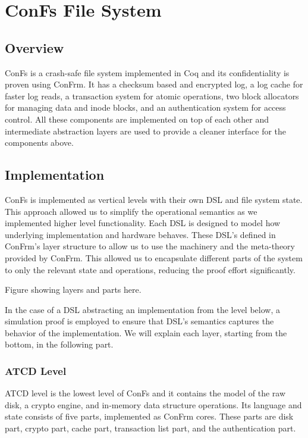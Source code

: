 \chapter{ConFs File System}

\section{Overview}
ConFs is a crash-safe file system implemented in Coq and its confidentiality is proven using ConFrm. It has a checksum based and encrypted log, a log cache for faster log reads, a transaction system for atomic operations, two block allocators for managing data and inode blocks, and an authentication system for access control. All these components are implemented on top of each other and intermediate abstraction layers are used to provide a cleaner interface for the components above.

\section{Implementation}
ConFs is implemented as vertical levels with their own DSL and file system state. This approach allowed us to simplify the operational semantics as we implemented higher level functionality. Each DSL is designed to model how underlying implementation and hardware behaves. These DSL's defined in ConFrm's layer structure to allow us to use the machinery and the meta-theory provided by ConFrm. This allowed us to encapsulate different parts of the system to only the relevant state and operations, reducing the proof effort significantly.

{\color{red} Figure showing layers and parts here}.

In the case of a DSL abstracting an implementation from the level below, a simulation proof is employed to ensure that DSL's semantics captures the behavior of the implementation. We will explain each layer, starting from the bottom, in the following part.

\subsection{ATCD Level}
ATCD level is the lowest level of ConFs and it contains the model of the raw disk, a crypto engine, and in-memory data structure operations. Its language and state consists of five parts, implemented as ConFrm cores. These parts are disk part, crypto part, cache part, transaction list part, and the authentication part. 

